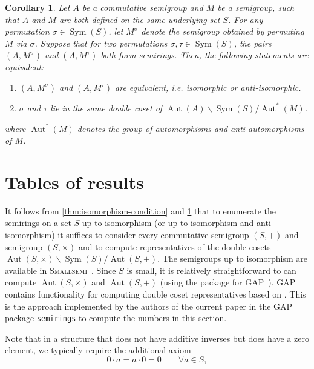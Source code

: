 \documentclass{article}
\theoremstyle{definition}
\theoremstyle{plain}
\newtheorem{cor}[defn]{Corollary}
\newcommand{\GAP}{\textsc{GAP}~\cite{GAP4}\xspace}
\newcommand{\Smallsemi}{\textsc{Smallsemi}~\cite{Smallsemi}\xspace}
\newcommand{\Sym}{\operatorname{Sym}}
\newcommand{\Aut}{\operatorname{Aut}}
\begin{document}

\begin{cor}
  \label{cor:equiv-condition}
  Let \(A\) be a commutative semigroup and \(M\) be a semigroup, such
  that \(A\) and \(M\) are both defined on the same underlying set
  \(S\). For any permutation \(\sigma \in \operatorname{Sym}(S)\),
  let \(M^\sigma\) denote the semigroup obtained by permuting \(M\)
  via \(\sigma\). Suppose that for two permutations \(\sigma,
  \tau\in\operatorname{Sym}(S)\), the pairs \((A,M^\sigma)\) and
  \((A,M^\tau)\) both form semirings. Then, the following statements
  are equivalent:
  \begin{enumerate}
    \item \((A, M^\sigma)\) and \((A, M^\tau)\) are equivalent, i.e.
      isomorphic or anti-isomorphic.
    \item \(\sigma\) and \(\tau\) lie in the same double coset of
      \(\operatorname{Aut}(A) \backslash \operatorname{Sym}(S) /
      \operatorname{Aut}^*(M)\).
  \end{enumerate}
  where \(\operatorname{Aut}^*(M)\) denotes the group of
  automorphisms and anti-automorphisms of \(M\).
\end{cor}

\section{Tables of results}

It follows from \cref{thm:isomorphism-condition} and
\cref{cor:equiv-condition} that to enumerate the
semirings on a set $S$ up to isomorphism (or up to isomorphism and
anti-isomorphism) it suffices to consider every
commutative semigroup $(S, +)$ and semigroup $(S, \times)$
and to compute representatives of the double cosets \(\Aut(S, \times)
\backslash \Sym(S) / \Aut(S, +)\). The semigroups up to isomorphism are
available in \Smallsemi.  Since $S$ is small, it is relatively
straightforward to can compute $\Aut(S, \times)$ and $\Aut(S, +)$ (using the
\Semigroups package for \GAP).
\GAP contains functionality for computing double coset
representatives based on \cite{}. This is the approach implemented by the
authors of the current paper in the \GAP package \texttt{semirings} to compute
the numbers in this section.

Note that in a structure that does not have additive inverses but
does have a zero element, we typically require the additional axiom
\begin{equation}
  \label{eq:rig-axiom}
  0\cdot a=a\cdot0=0\qquad\forall a\in S,
\end{equation}
\end{document}
